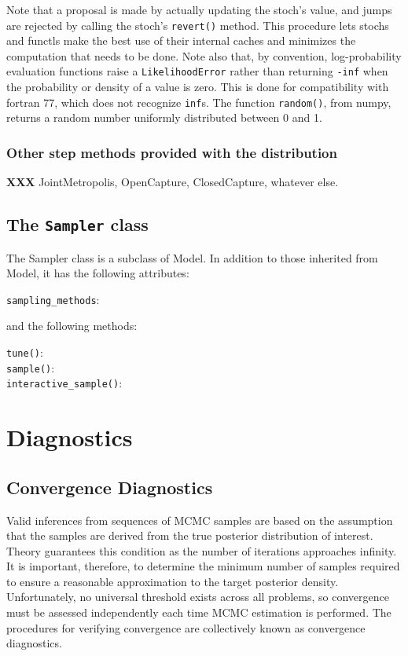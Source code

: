 \documentclass[]{book}
\begin{document}
Note that a proposal is made by actually updating the stoch's value, and jumps are rejected by calling the stoch's \texttt{revert()} method. This procedure lets stochs and functls make the best use of their internal caches and minimizes the computation that needs to be done. Note also that, by convention, log-probability evaluation functions raise a \texttt{LikelihoodError} rather than returning \texttt{-inf} when the probability or density of a value is zero. This is done for compatibility with fortran 77, which does not recognize \texttt{inf}s. The function \texttt{random()}, from numpy, returns a random number uniformly distributed between 0 and 1.


\subsection{Other step methods provided with the distribution}\label{sub:other_sm}
\textbf{XXX} JointMetropolis, OpenCapture, ClosedCapture, whatever else.




\section{The \texttt{Sampler} class}\label{sec:Sampler}
The Sampler class is a subclass of Model. In addition to those inherited from Model, it has the following attributes:
\begin{description}
	\item[\texttt{sampling\_methods}:]
\end{description}
and the following methods:
\begin{description}
	\item[\texttt{tune()}:]
	\item[\texttt{sample()}:]
	\item[\texttt{interactive\_sample()}:] 
\end{description}


\chapter{Diagnostics} %

\section{Convergence Diagnostics}

Valid inferences from sequences of MCMC samples are based on the assumption that the samples are derived from the true posterior distribution of interest. Theory guarantees this condition as the number of iterations approaches infinity. It is important, therefore, to determine the minimum number of samples required to ensure a reasonable approximation to the target posterior density. Unfortunately, no universal threshold exists across all problems, so convergence must be assessed independently each time MCMC estimation is performed. The procedures for verifying convergence are collectively known as convergence diagnostics.
\end{document}
